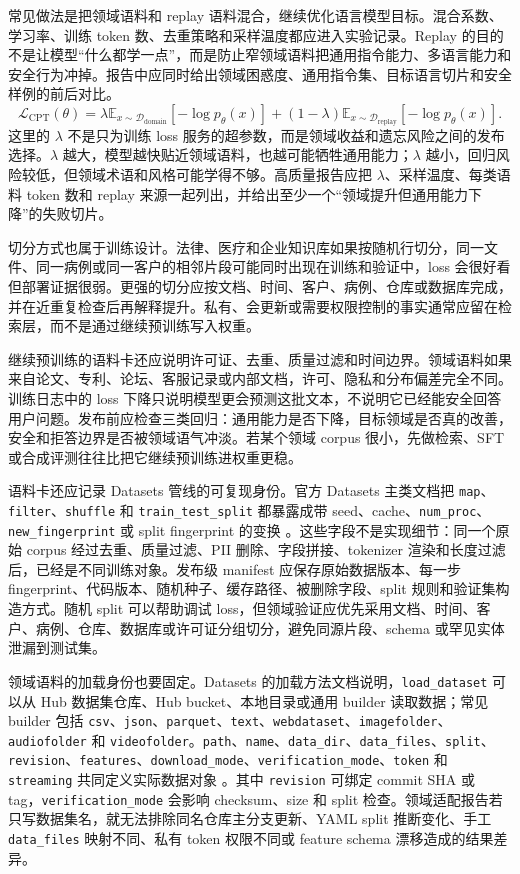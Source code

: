 \documentclass[UTF8,zihao=-4,openany]{ctexbook}
\begin{document}
常见做法是把领域语料和 replay 语料混合，继续优化语言模型目标。混合系数、学习率、训练 token 数、去重策略和采样温度都应进入实验记录。Replay 的目的不是让模型“什么都学一点”，而是防止窄领域语料把通用指令能力、多语言能力和安全行为冲掉。报告中应同时给出领域困惑度、通用指令集、目标语言切片和安全样例的前后对比。
\[
  \mathcal{L}_{\mathrm{CPT}}(\theta)
  =
  \lambda\mathbb{E}_{x\sim\mathcal{D}_{\mathrm{domain}}}
  [-\log p_\theta(x)]
  +(1-\lambda)\mathbb{E}_{x\sim\mathcal{D}_{\mathrm{replay}}}
  [-\log p_\theta(x)] .
\]
这里的 $\lambda$ 不是只为训练 loss 服务的超参数，而是领域收益和遗忘风险之间的发布选择。$\lambda$ 越大，模型越快贴近领域语料，也越可能牺牲通用能力；$\lambda$ 越小，回归风险较低，但领域术语和风格可能学得不够。高质量报告应把 $\lambda$、采样温度、每类语料 token 数和 replay 来源一起列出，并给出至少一个“领域提升但通用能力下降”的失败切片。

切分方式也属于训练设计。法律、医疗和企业知识库如果按随机行切分，同一文件、同一病例或同一客户的相邻片段可能同时出现在训练和验证中，loss 会很好看但部署证据很弱。更强的切分应按文档、时间、客户、病例、仓库或数据库完成，并在近重复检查后再解释提升。私有、会更新或需要权限控制的事实通常应留在检索层，而不是通过继续预训练写入权重。

继续预训练的语料卡还应说明许可证、去重、质量过滤和时间边界。领域语料如果来自论文、专利、论坛、客服记录或内部文档，许可、隐私和分布偏差完全不同。训练日志中的 loss 下降只说明模型更会预测这批文本，不说明它已经能安全回答用户问题。发布前应检查三类回归：通用能力是否下降，目标领域是否真的改善，安全和拒答边界是否被领域语气冲淡。若某个领域 corpus 很小，先做检索、SFT 或合成评测往往比把它继续预训练进权重更稳。

语料卡还应记录 Datasets 管线的可复现身份。官方 Datasets 主类文档把 \texttt{map}、\texttt{filter}、\texttt{shuffle} 和 \texttt{train\_test\_split} 都暴露成带 seed、cache、\texttt{num\_proc}、\texttt{new\_fingerprint} 或 split fingerprint 的变换 \cite{huggingface2026datasetsmainclasses}。这些字段不是实现细节：同一个原始 corpus 经过去重、质量过滤、PII 删除、字段拼接、tokenizer 渲染和长度过滤后，已经是不同训练对象。发布级 manifest 应保存原始数据版本、每一步 fingerprint、代码版本、随机种子、缓存路径、被删除字段、split 规则和验证集构造方式。随机 split 可以帮助调试 loss，但领域验证应优先采用文档、时间、客户、病例、仓库、数据库或许可证分组切分，避免同源片段、schema 或罕见实体泄漏到测试集。

领域语料的加载身份也要固定。Datasets 的加载方法文档说明，\texttt{load\_dataset} 可以从 Hub 数据集仓库、Hub bucket、本地目录或通用 builder 读取数据；常见 builder 包括 \texttt{csv}、\texttt{json}、\texttt{parquet}、\texttt{text}、\texttt{webdataset}、\texttt{imagefolder}、\texttt{audiofolder} 和 \texttt{videofolder}。\texttt{path}、\texttt{name}、\texttt{data\_dir}、\texttt{data\_files}、\texttt{split}、\texttt{revision}、\texttt{features}、\texttt{download\_mode}、\texttt{verification\_mode}、\texttt{token} 和 \texttt{streaming} 共同定义实际数据对象 \cite{huggingface2026datasetsloading}。其中 \texttt{revision} 可绑定 commit SHA 或 tag，\texttt{verification\_mode} 会影响 checksum、size 和 split 检查。领域适配报告若只写数据集名，就无法排除同名仓库主分支更新、YAML split 推断变化、手工 \texttt{data\_files} 映射不同、私有 token 权限不同或 feature schema 漂移造成的结果差异。
\end{document}
